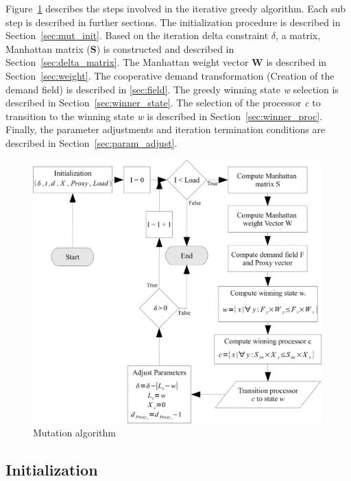 Figure~\ref{fig:mutation_algo} describes the steps involved in the iterative greedy algorithm. 
Each sub step is described in further sections. The initialization procedure is described in Section~\ref{sec:mut_init}.
Based on the iteration delta constraint $\delta$, a matrix, Manhattan
matrix (\textbf{S}) is constructed and described in Section~\ref{sec:delta_matrix}.
The Manhattan weight vector \textbf{W} is described in Section~\ref{sec:weight}.
The cooperative demand transformation (Creation of the demand field) is described in
\ref{sec:field}. The greedy winning state \textit{w} selection is described in Section~\ref{sec:winner_state}.
The selection of the processor \textit{c} to transition to the winning state \textit{w} 
is described in Section~\ref{sec:winner_proc}. Finally, the parameter adjustments and iteration
termination conditions are described in Section~\ref{sec:param_adjust}. 

\begin{figure}[h!]
  \begin{center}
    \includegraphics[height=4in]{figures/Mutation_algo.jpg}%
    \caption{Mutation algorithm}
    \label{fig:mutation_algo}
  \end{center}
\end{figure}

\subsection{Initialization}~\label{sec:mut_init}

